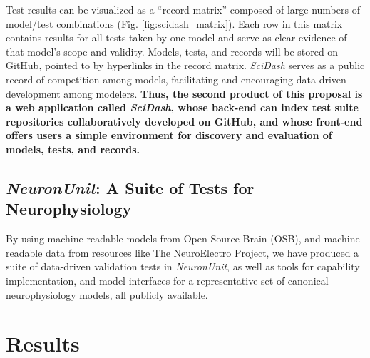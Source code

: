 \documentclass[11pt,letterpaper]{article}
\begin{document}
Test results can be visualized as a ``record matrix'' composed of large numbers of model/test combinations (Fig. \ref{fig:scidash_matrix}).  
Each row in this matrix contains results for all tests taken by one model and serve as clear evidence of that model's scope and validity.  
Models, tests, and records will be stored on GitHub, pointed to by hyperlinks in the record matrix. 
\textit{SciDash} serves as a public record of competition among models, facilitating and encouraging data-driven development among modelers.
\textbf{Thus, the second product of this proposal is a web application called \textit{SciDash}, whose back-end can index test suite repositories collaboratively developed on GitHub, and whose front-end offers users a simple environment for discovery and evaluation of models, tests, and records.}  

\subsection{\textit{NeuronUnit}: A Suite of Tests for Neurophysiology}\label{sec:neuronunit}
By using machine-readable models from Open Source Brain (OSB), and machine-readable data from resources like The NeuroElectro Project\cite{neuroelectro_url}, we have produced a suite of data-driven validation tests in \textit{NeuronUnit}, as well as tools for capability implementation, and model interfaces for a representative set of canonical neurophysiology models, all publicly available. 

\section{Results}
\end{document}
